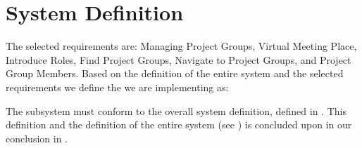 \section{System Definition}
\label{sec:subSysDef}
The selected requirements are: Managing Project Groups, Virtual Meeting Place, Introduce Roles, Find Project Groups, Navigate to Project Groups, and Project Group Members. 
Based on the definition of the entire system and the selected requirements we define the \subsystem{} we are implementing as: 

The subsystem must conform to the overall system definition, defined in .
This definition and the definition of the entire system (see ) is concluded upon in our conclusion in .